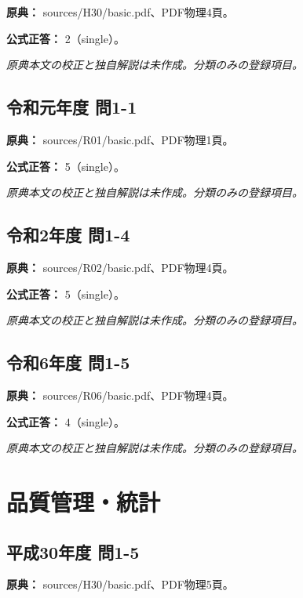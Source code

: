 \noindent\textbf{原典：} sources/H30/basic.pdf、PDF物理4頁。

\textbf{公式正答：} 2（single）。

\par\textit{原典本文の校正と独自解説は未作成。分類のみの登録項目。}

\subsection{令和元年度 問1-1}
\label{q:r01-reg-basic-1-1}

\noindent\textbf{原典：} sources/R01/basic.pdf、PDF物理1頁。

\textbf{公式正答：} 5（single）。

\par\textit{原典本文の校正と独自解説は未作成。分類のみの登録項目。}

\subsection{令和2年度 問1-4}
\label{q:r02-reg-basic-1-4}

\noindent\textbf{原典：} sources/R02/basic.pdf、PDF物理4頁。

\textbf{公式正答：} 5（single）。

\par\textit{原典本文の校正と独自解説は未作成。分類のみの登録項目。}

\subsection{令和6年度 問1-5}
\label{q:r06-reg-basic-1-5}

\noindent\textbf{原典：} sources/R06/basic.pdf、PDF物理4頁。

\textbf{公式正答：} 4（single）。

\par\textit{原典本文の校正と独自解説は未作成。分類のみの登録項目。}

\section{品質管理・統計}

\subsection{平成30年度 問1-5}
\label{q:h30-reg-basic-1-5}

\noindent\textbf{原典：} sources/H30/basic.pdf、PDF物理5頁。

